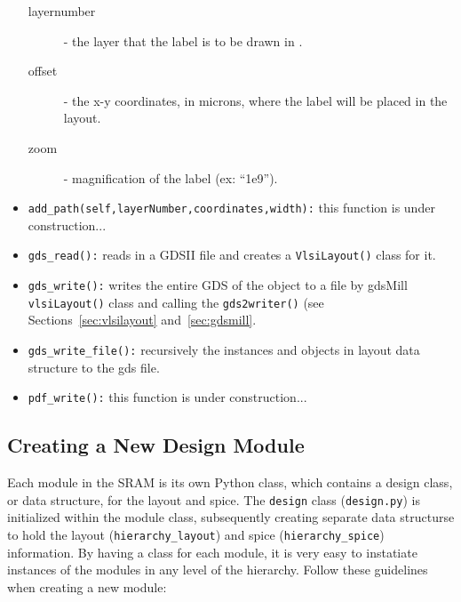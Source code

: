 \begin{itemize}
\begin{description}
  \item[layernumber] - the layer that the label is to be drawn in .
  \item[offset] - the x-y coordinates, in microns, where the label
    will be placed in the layout.
  \item[zoom] - magnification of the label (ex: ``1e9'').
  \end{description}
\item \verb|add_path(self,layerNumber,coordinates,width):| this
  function is under construction...
\item \verb|gds_read():| reads in a GDSII file and creates a
  \verb|VlsiLayout()| class for it.
\item \verb|gds_write():| writes the entire GDS of the object to a
  file by gdsMill \verb|vlsiLayout()| class and calling the
  \verb|gds2writer()| (see Sections~\ref{sec:vlsilayout}
  and~\ref{sec:gdsmill}.
\item \verb|gds_write_file():| recursively the instances and objects
  in layout data structure to the gds file.
\item \verb|pdf_write():| this function is under construction...
\end{itemize}


\subsection{Creating a New Design Module}
\label{sec:new_design}

Each module in the SRAM is its own Python class, which contains a
design class, or data structure, for the layout and spice.  The
\verb|design| class (\verb|design.py|) is initialized within the
module class, subsequently creating separate data structurse to hold
the layout (\verb|hierarchy_layout|) and spice
(\verb|hierarchy_spice|) information.  By having a class for each
module, it is very easy to instatiate instances of the modules in any
level of the hierarchy.  Follow these guidelines when creating a new
module:


